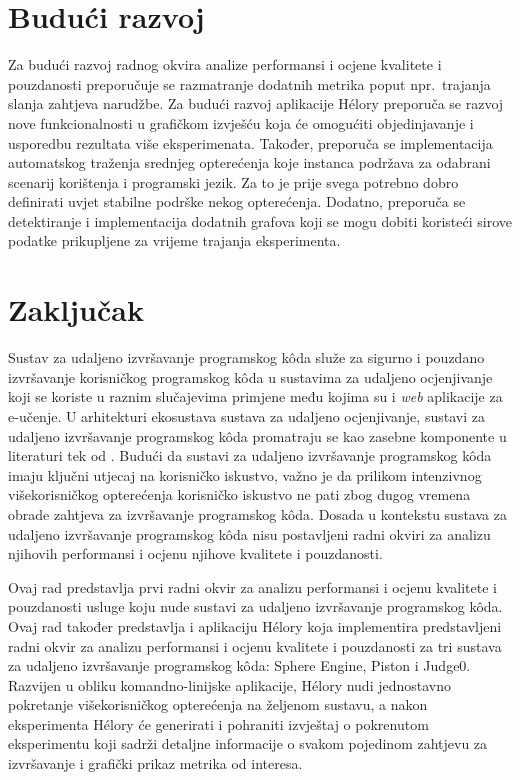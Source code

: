 \documentclass[times, utf8, diplomski]{fer}
\begin{document}
\chapter{Budući razvoj}
\label{chap:future}
Za budući razvoj radnog okvira analize performansi i ocjene kvalitete i pouzdanosti preporučuje se razmatranje dodatnih metrika poput npr.\ trajanja slanja zahtjeva narudžbe. Za budući razvoj aplikacije Hélory preporuča se razvoj nove funkcionalnosti u grafičkom izvješću koja će omogućiti objedinjavanje i usporedbu rezultata više eksperimenata. Također, preporuča se implementacija automatskog traženja srednjeg opterećenja koje instanca podržava za odabrani scenarij korištenja i programski jezik. Za to je prije svega potrebno dobro definirati uvjet stabilne podrške nekog opterećenja. Dodatno, preporuča se detektiranje i implementacija dodatnih grafova koji se mogu dobiti koristeći sirove podatke prikupljene za vrijeme trajanja eksperimenta.

\chapter{Zaključak}
Sustav za udaljeno izvršavanje programskog kôda služe za sigurno i pouzdano izvršavanje korisničkog programskog kôda u sustavima za udaljeno ocjenjivanje koji se koriste u raznim slučajevima primjene među kojima su i \textit{web} aplikacije za e-učenje. U arhitekturi ekosustava sustava za udaljeno ocjenjivanje, sustavi za udaljeno izvršavanje programskog kôda promatraju se kao zasebne komponente u literaturi tek od \citep{9245310}. Budući da sustavi za udaljeno izvršavanje programskog kôda imaju ključni utjecaj na korisničko iskustvo, važno je da prilikom intenzivnog višekorisničkog opterećenja korisničko iskustvo ne pati zbog dugog vremena obrade zahtjeva za izvršavanje programskog kôda. Dosada u kontekstu sustava za udaljeno izvršavanje programskog kôda nisu postavljeni radni okviri za analizu njihovih performansi i ocjenu njihove kvalitete i pouzdanosti.

Ovaj rad predstavlja prvi radni okvir za analizu performansi i ocjenu kvalitete i pouzdanosti usluge koju nude sustavi za udaljeno izvršavanje programskog kôda. Ovaj rad također predstavlja i aplikaciju Hélory koja implementira predstavljeni radni okvir za analizu performansi i ocjenu kvalitete i pouzdanosti za tri sustava za udaljeno izvršavanje programskog kôda: Sphere Engine, Piston i Judge0. Razvijen u obliku komandno-linijske aplikacije, Hélory nudi jednostavno pokretanje višekorisničkog opterećenja na željenom sustavu, a nakon eksperimenta Hélory će generirati i pohraniti izvještaj o pokrenutom eksperimentu koji sadrži detaljne informacije o svakom pojedinom zahtjevu za izvršavanje i grafički prikaz metrika od interesa.
\end{document}
